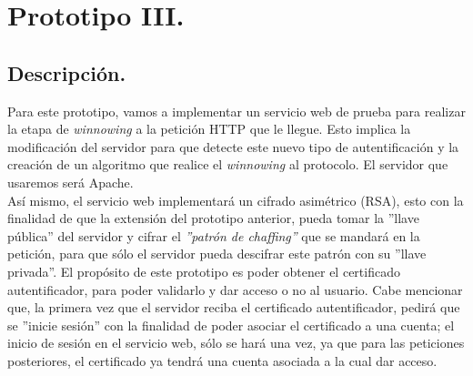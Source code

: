 \documentclass[12pt, a4paper, titlepage]{report}
\begin{document}
	    \section{Prototipo III.}
	        \subsection{Descripción.}
	            Para este prototipo, vamos a implementar un servicio web de prueba para realizar la etapa de \textit{winnowing} a la petición HTTP que le llegue. Esto implica la modificación del servidor para que detecte este nuevo tipo de autentificación y la creación de un algoritmo que realice el \textit{winnowing} al protocolo. El servidor que usaremos será Apache.\\
	            Así mismo, el servicio web implementará un cifrado asimétrico (RSA), esto con la finalidad de que la extensión del prototipo anterior, pueda tomar la ''llave pública'' del servidor y cifrar el \textit{''patrón de chaffing''} que se mandará en la petición, para que sólo el servidor pueda descifrar este patrón con su ''llave privada''.
	            El propósito de este prototipo es poder obtener el certificado autentificador, para poder validarlo y dar acceso o no al usuario. Cabe mencionar que, la primera vez que el servidor reciba el certificado autentificador, pedirá que se ''inicie sesión'' con la finalidad de poder asociar el certificado a una cuenta; el inicio de sesión en el servicio web, sólo se hará una vez, ya que para las peticiones posteriores, el certificado ya tendrá una cuenta asociada a la cual dar acceso.
	            
	        
	        
	    
\end{document}

